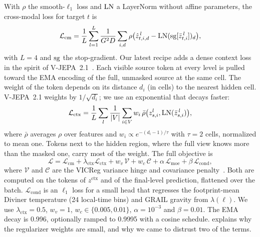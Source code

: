 With $\rho$ the smooth-$\ell_1$ loss and $\operatorname{LN}$ a LayerNorm without affine parameters, the cross-modal loss for target $t$ is
\begin{equation}
  \mathcal{L}_{\text{cm}} = \frac{1}{L}\sum_{l=1}^{L} \frac{1}{G^2 D}\sum_{i,d}
  \rho\big(\hat z^{\,l}_{t,i,d} - \operatorname{LN}(\operatorname{sg}[\bar z^{\,l}_{t,i}])_d\big),
  \label{eq:cm}
\end{equation}
with $L{=}4$ and $\operatorname{sg}$ the stop-gradient. Our latest recipe adds a dense context loss in the spirit of V-JEPA~2.1~\cite{murlabadia2026vjepa}. Each visible source token at every level is pulled toward the EMA encoding of the full, unmasked source at the same cell. The weight of the token depends on its distance $d_i$ (in cells) to the nearest hidden cell. V-JEPA~2.1 weights by $1/\sqrt{d_i}$; we use an exponential that decays faster:
\begin{equation}
  \mathcal{L}_{\text{ctx}} = \frac{1}{L}\sum_{l} \frac{1}{|V|}\sum_{i\in V} w_i\, \bar\rho\big(z^{l}_{s,i}, \operatorname{LN}(\bar z^{\,l}_{s,i})\big),
  \label{eq:ctx}
\end{equation}
where $\bar\rho$ averages $\rho$ over features and $w_i \propto e^{-(d_i-1)/\tau}$ with $\tau{=}2$ cells, normalized to mean one. Tokens next to the hidden region, where the full view knows more than the masked one, carry most of the weight. The full objective is
\begin{equation}
  \mathcal{L} = \mathcal{L}_{\text{cm}} + \lambda_{\text{ctx}}\mathcal{L}_{\text{ctx}}
  + w_v\,\mathcal{V} + w_c\,\mathcal{C} + \alpha\,\mathcal{L}_{\text{moe}} + \beta\,\mathcal{L}_{\text{cond}},
  \label{eq:total}
\end{equation}
where $\mathcal{V}$ and $\mathcal{C}$ are the VICReg variance hinge and covariance penalty~\cite{bardes2022vicreg}. Both are computed on the tokens of $z^{\text{ctx}}$ and of the final-level prediction, flattened over the batch. $\mathcal{L}_{\text{cond}}$ is an $\ell_1$ loss for a small head that regresses the footprint-mean Diviner temperature (24 local-time bins) and GRAIL gravity from $\lambda(\ell)$. We use $\lambda_{\text{ctx}}{=}0.5$, $w_v{=}1$, $w_c \in \{0.005, 0.01\}$, $\alpha{=}10^{-3}$ and $\beta{=}0.01$. The EMA decay is 0.996, optionally ramped to 0.9995 with a cosine schedule.  explains why the regularizer weights are small, and why we came to distrust two of the terms.
